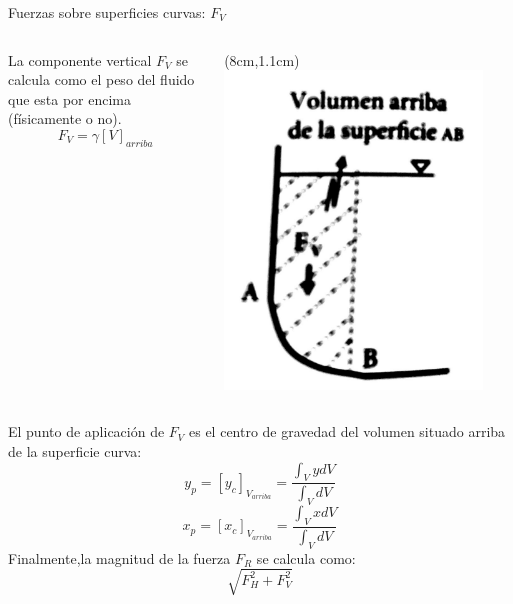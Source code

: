 \documentclass [xcolor=svgnames, t] {beamer}
\begin{document}
\begin{frame}{Fuerzas sobre superficies curvas: $F_V$}
\begin{columns}
La componente vertical $F_V$ se calcula como el peso del fluido que esta por encima (f\'isicamente o no). 
$$
F_V = \gamma [V]_{arriba}
$$
\begin{textblock*}{3cm}(8cm,1.1cm) %
\includegraphics[width=0.9\textwidth]{curb4}
\end{textblock*}
\end{columns}
\vspace{0.8cm}
El punto de aplicaci\'on de $F_V$ es el centro de gravedad del volumen situado arriba de la superficie curva:
$$
y_p = [y_c ]_{V_{arriba}} = \frac{\int_V y dV}{\int_V dV}
$$
$$
x_p = [x_c ]_{V_{arriba}}= \frac{\int_V x dV}{\int_V dV}
$$
Finalmente,la magnitud de la fuerza $F_R$ se calcula como:
$$
\sqrt{F_H^2 + F_V^2}
$$
\end{frame}

\end{document}

